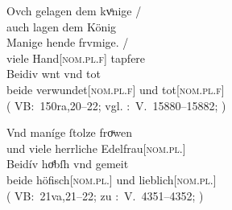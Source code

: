 \begin{exe}
\begin{xlist}
	\ex \label{ex:konjadjvvbeidiu_4} %
		\gll Ovch gelagen dem kvͤnige {/} \\
			auch lagen dem König \\
		\gll Manige hende frvmige. {/} \\
			viele Hand[\textsc{nom.pl.f\subM}] tapfere \\
		\gll Beidiv wnt vnd tot \\
			beide verwundet[\textsc{nom.pl.f\subM}] und
			tot[\textsc{nom.pl.f\subM}] \\
		\trans {}
			(%
				VB:~150ra,20--22; vgl.
				\KC:~V.~15880--15882;
				\cite[363]{schroeder1895}%
			)


	\ex \label{ex:konjadjvvbeidiu_6} %
		\gll Vnd maníge ſtolze froͮwen \\
			und viele herrliche Edelfrau[\textsc{nom.pl.\FemF}] \\
	\sn \gll Beidív hoͤbſh vnd gemeit \\
			beide höfisch[\textsc{nom.pl.\FemF}] und lieblich[\textsc{nom.pl.\FemF}] \\
		\trans {}
			(%
				VB:~21va,21--22; zu
				\KC:~V.~4351--4352;
				\cite[161]{schroeder1895}%
			)
	\end{xlist}
\end{exe}

